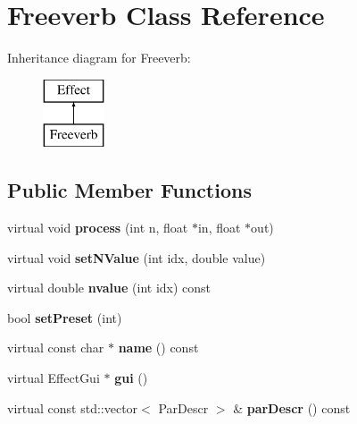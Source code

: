 \hypertarget{class_freeverb}{}\section{Freeverb Class Reference}
\label{class_freeverb}
Inheritance diagram for Freeverb\+:\begin{figure}[H]
\begin{center}
\leavevmode
\includegraphics[height=2.000000cm]{class_freeverb}
\end{center}
\end{figure}
\subsection*{Public Member Functions}
\begin{DoxyCompactItemize}
\item 
\mbox{\label{class_freeverb_afafce980fd3c85f26bbcc2d0055253af}} 
virtual void {\bfseries process} (int n, float $\ast$in, float $\ast$out)
\item 
\mbox{\label{class_freeverb_afd52fb91eb82f1867168857bb6b69722}} 
virtual void {\bfseries set\+N\+Value} (int idx, double value)
\item 
\mbox{\label{class_freeverb_a1fbbcb3a6e1de9789cf9318c45957481}} 
virtual double {\bfseries nvalue} (int idx) const
\item 
\mbox{\label{class_freeverb_abccb4b80bc776470a6f7a5d8c12948c5}} 
bool {\bfseries set\+Preset} (int)
\item 
\mbox{\label{class_freeverb_ae88e31cf2720d706dfa546585cdf1e44}} 
virtual const char $\ast$ {\bfseries name} () const
\item 
\mbox{\label{class_freeverb_a2cec51ec7bef23169c3e3c20d97d5419}} 
virtual Effect\+Gui $\ast$ {\bfseries gui} ()
\item 
\mbox{\label{class_freeverb_afe558bbc75ef47d6fecf17a942b26748}} 
virtual const std\+::vector$<$ Par\+Descr $>$ \& {\bfseries par\+Descr} () const
\end{DoxyCompactItemize}


